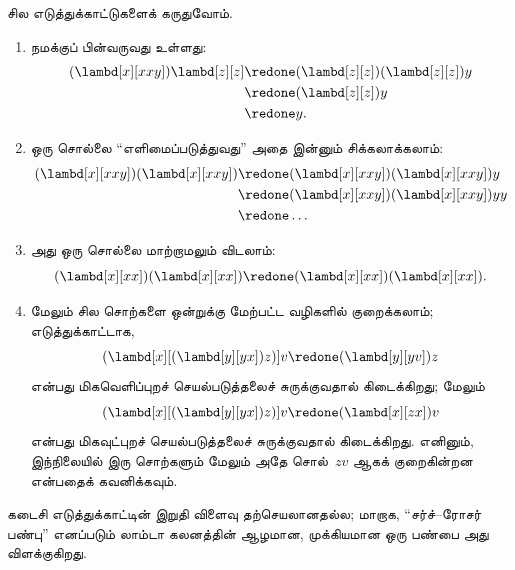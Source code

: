 \documentclass[../../../include/open-logic-section]{subfiles}
\begin{document}
சில எடுத்துக்காட்டுகளைக் கருதுவோம்.
\begin{enumerate}
\item நமக்குப் பின்வருவது உள்ளது:
\begin{align*}
(\lambd[x][xxy]) \lambd[z][z] & \redone (\lambd[z][z])(\lambd[z][z]) y \\
& \redone (\lambd[z][z]) y \\
& \redone y.
\end{align*}
\item ஒரு சொல்லை ``எளிமைப்படுத்துவது'' அதை இன்னும் சிக்கலாக்கலாம்:
\begin{align*}
(\lambd[x][xxy])(\lambd[x][xxy]) & \redone (\lambd[x][xxy])(\lambd[x][xxy])y \\
& \redone (\lambd[x][xxy])(\lambd[x][xxy])yy \\
& \redone \dots
\end{align*}
\item அது ஒரு சொல்லை மாற்றாமலும் விடலாம்:
\[
(\lambd[x][xx])(\lambd[x][xx]) \redone (\lambd[x][xx])(\lambd[x][xx]).
\]
\item மேலும் சில சொற்களை ஒன்றுக்கு மேற்பட்ட வழிகளில் குறைக்கலாம்;
  எடுத்துக்காட்டாக,
\[
(\lambd[x][(\lambd[y][yx]) z)] v \redone (\lambd[y][yv]) z
\]
என்பது மிகவெளிப்புறச் செயல்படுத்தலைச் சுருக்குவதால் கிடைக்கிறது; மேலும்
\[
(\lambd[x][(\lambd[y][yx]) z)] v \redone (\lambd[x][zx]) v
\]
என்பது மிகவுட்புறச் செயல்படுத்தலைச் சுருக்குவதால் கிடைக்கிறது. எனினும்,
இந்நிலையில் இரு சொற்களும் மேலும் அதே சொல்~$zv$ ஆகக் குறைகின்றன என்பதைக்
கவனிக்கவும்.
\end{enumerate}

கடைசி எடுத்துக்காட்டின் இறுதி விளைவு தற்செயலானதல்ல; மாறாக, ``சர்ச்--ரோசர்
பண்பு'' எனப்படும் லாம்டா கலனத்தின் ஆழமான, முக்கியமான ஒரு பண்பை அது
விளக்குகிறது.
\end{document}
